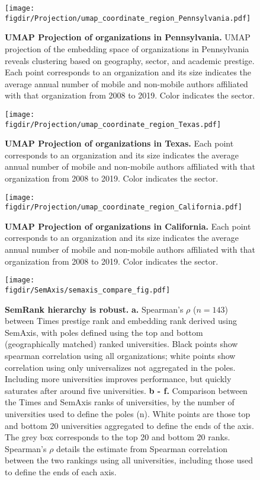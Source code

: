 \documentclass[12pt]{article} %
\def\figdir{../Figs}
\begin{document}
%
%
\begin{figure}[hp!]
	\centering
	\texttt{[image: \\figdir/Projection/umap\_coordinate\_region\_Pennsylvania.pdf]}
	\caption{
		\textbf{UMAP Projection of organizations in Pennsylvania.}
		UMAP projection of the embedding space of organizations in Pennsylvania reveals clustering based on geography, sector, and academic prestige.
		Each point corresponds to an organization and its size indicates the average annual number of mobile and non-mobile authors affiliated with that organization from 2008 to 2019.
		Color indicates the sector.
	}
	\label{fig:supp:proj_pennsylvania}
\end{figure}


%
%
\begin{figure}[hp!]
	\centering
	\texttt{[image: \\figdir/Projection/umap\_coordinate\_region\_Texas.pdf]}
	\caption{
		\textbf{UMAP Projection of organizations in Texas.}
		Each point corresponds to an organization and its size indicates the average annual number of mobile and non-mobile authors affiliated with that organization from 2008 to 2019.
		Color indicates the sector.
	}
	\label{fig:supp:proj_texas}
\end{figure}



%
%
\begin{figure}[hp!]
	\centering
	\texttt{[image: \\figdir/Projection/umap\_coordinate\_region\_California.pdf]}
	\caption{
		\textbf{UMAP Projection of organizations in California.}
		Each point corresponds to an organization and its size indicates the average annual number of mobile and non-mobile authors affiliated with that organization from 2008 to 2019.
		Color indicates the sector.
	}
	\label{fig:supp:proj_california}
\end{figure}




%
%
\begin{figure}[hp!]
	\centering
	\texttt{[image: \\figdir/SemAxis/semaxis\_compare\_fig.pdf]}
	\caption{
		\textbf{SemRank hierarchy is robust.}
		\textbf{a.} Spearman's $\rho$ ($n = 143$) between Times prestige rank and embedding rank derived using SemAxis, with poles defined using the top and bottom (geographically matched) ranked universities.
		Black points show spearman correlation using all organizations; white points show correlation using only universalizes not aggregated in the poles.
		Including more universities improves performance, but quickly saturates after around five universities.
		\textbf{b - f.} Comparison between the Times and SemAxis ranks of universities, by the number of universities used to define the poles (n).
		White points are those top and bottom 20 universities aggregated to define the ends of the axis.
		The grey box corresponds to the top 20 and bottom 20 ranks.
	  	Spearman's $\rho$ details the estimate from Spearman correlation between the two rankings using all universities, including those used to define the ends of each axis.
	}
	\label{fig:supp:semaxis_compare}
\end{figure}
\end{document}
